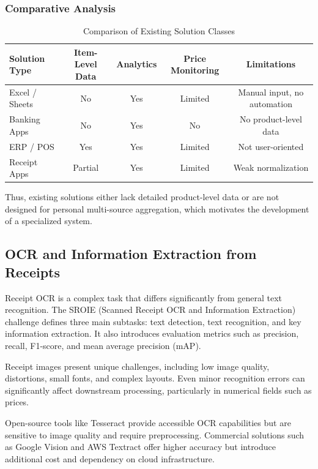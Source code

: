 \subsubsection{Comparative Analysis}

\begin{table}[h]
\centering
\caption{Comparison of Existing Solution Classes}
\begin{tabular}{|l|c|c|c|c|}
\hline
\textbf{Solution Type} & \textbf{Item-Level Data} & \textbf{Analytics} & \textbf{Price Monitoring} & \textbf{Limitations} \\
\hline
Excel / Sheets & No & Yes & Limited & Manual input, no automation \\
\hline
Banking Apps & No & Yes & No & No product-level data \\
\hline
ERP / POS & Yes & Yes & Limited & Not user-oriented \\
\hline
Receipt Apps & Partial & Yes & Limited & Weak normalization \\
\hline
\end{tabular}
\end{table}

Thus, existing solutions either lack detailed product-level data or are not designed for personal multi-source aggregation, which motivates the development of a specialized system.

\subsection{OCR and Information Extraction from Receipts}

Receipt OCR is a complex task that differs significantly from general text recognition. The SROIE (Scanned Receipt OCR and Information Extraction) challenge defines three main subtasks: text detection, text recognition, and key information extraction. It also introduces evaluation metrics such as precision, recall, F1-score, and mean average precision (mAP).

Receipt images present unique challenges, including low image quality, distortions, small fonts, and complex layouts. Even minor recognition errors can significantly affect downstream processing, particularly in numerical fields such as prices.

Open-source tools like Tesseract provide accessible OCR capabilities but are sensitive to image quality and require preprocessing. Commercial solutions such as Google Vision and AWS Textract offer higher accuracy but introduce additional cost and dependency on cloud infrastructure.

